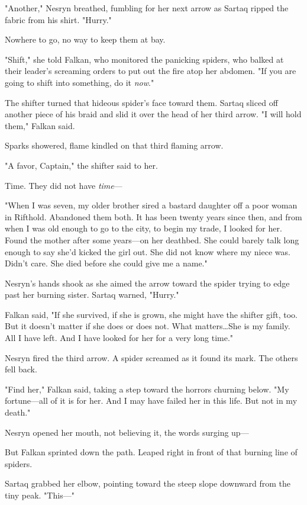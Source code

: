 "Another," Nesryn breathed, fumbling for her next arrow as Sartaq ripped the fabric from his shirt.
"Hurry."

Nowhere to go, no way to keep them at bay.

"Shift," she told Falkan, who monitored the panicking spiders, who balked at their leader's screaming orders to put out the fire atop her abdomen.
"If you are going to shift into something, do it \emph{now}."

The shifter turned that hideous spider's face toward them.
Sartaq sliced off another piece of his braid and slid it over the head of her third arrow.
"I will hold them," Falkan said.

Sparks showered, flame kindled on that third flaming arrow.

"A favor, Captain," the shifter said to her.

Time.
They did not have \emph{time}---

"When I was seven, my older brother sired a bastard daughter off a poor woman in Rifthold.
Abandoned them both.
It has been twenty years since then, and from when I was old enough to go to the city, to begin my trade, I looked for her.
Found the mother after some years---on her deathbed.
She could barely talk long enough to say she'd kicked the girl out.
She did not know where my niece was.
Didn't care.
She died before she could give me a name."

Nesryn's hands shook as she aimed the arrow toward the spider trying to edge past her burning sister.
Sartaq warned, "Hurry."

Falkan said, "If she survived, if she is grown, she might have the shifter gift, too.
But it doesn't matter if she does or does not.
What matters\ldots She is my family.
All I have left.
And I have looked for her for a very long time."

Nesryn fired the third arrow.
A spider screamed as it found its mark.
The others fell back.

"Find her," Falkan said, taking a step toward the horrors churning below.
"My fortune---all of it is for her.
And I may have failed her in this life.
But not in my death."

Nesryn opened her mouth, not believing it, the words surging up---

But Falkan sprinted down the path.
Leaped right in front of that burning line of spiders.

Sartaq grabbed her elbow, pointing toward the steep slope downward from the tiny peak.
"This---"

